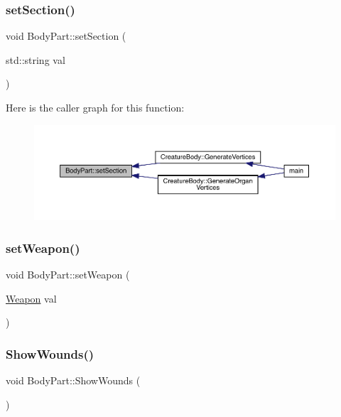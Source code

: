 \subsubsection{\texorpdfstring{set\+Section()}{setSection()}}
{\footnotesize\ttfamily void Body\+Part\+::set\+Section (\begin{DoxyParamCaption}\item[{std\+::string}]{val }\end{DoxyParamCaption})}

Here is the caller graph for this function\+:
\nopagebreak
\begin{figure}[H]
\begin{center}
\leavevmode
\includegraphics[width=350pt]{d2/d6f/class_body_part_acae2236af2e131dfb8a49b4ca62d0d1f_icgraph}
\end{center}
\end{figure}
\mbox{\label{class_body_part_a12897c5566d467977f7bbbe39665c4f5}} 
\subsubsection{\texorpdfstring{set\+Weapon()}{setWeapon()}}
{\footnotesize\ttfamily void Body\+Part\+::set\+Weapon (\begin{DoxyParamCaption}\item[{\mbox{\hyperlink{class_weapon}{Weapon}}}]{val }\end{DoxyParamCaption})}

\mbox{\label{class_body_part_a59d24b904169031b36cef2f4ba2847f1}} 
\subsubsection{\texorpdfstring{Show\+Wounds()}{ShowWounds()}}
{\footnotesize\ttfamily void Body\+Part\+::\+Show\+Wounds (\begin{DoxyParamCaption}{ }\end{DoxyParamCaption})}



